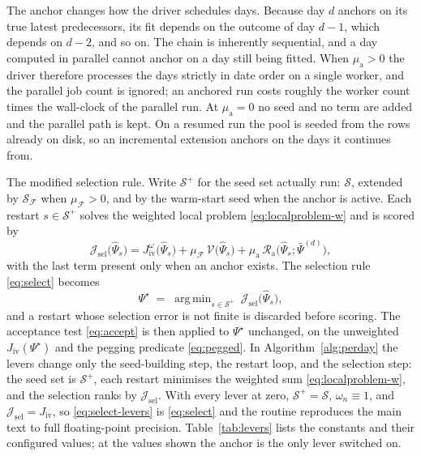 \documentclass[a4paper, 11pt, reqno]{amsart}
\makeatletter
\def\paragraph{\@startsection{paragraph}{4}%
	\z@\z@{-\fontdimen2\font}%
	{\normalfont\bfseries}}
\DeclareMathOperator*{\argmin}{arg\,min}
\newcommand{\ConstFellerPenaltySym}{\mu_{\mathcal{F}}}   \newcommand{\ConstFellerPenaltyVal}{0.0}
\newcommand{\ConstAnchorWeightSym}{\mu_{\mathrm{a}}}     \newcommand{\ConstAnchorWeightVal}{0.005}
\makeatother
\begin{document}
		The anchor changes how the driver schedules days. Because day $d$ anchors on its true latest
		predecessors, its fit depends on the outcome of day $d-1$, which depends on $d-2$, and so on. The
		chain is inherently sequential, and a day computed in parallel cannot anchor on a day still being
		fitted. When $\ConstAnchorWeightSym>0$ the driver therefore processes the days strictly in date
		order on a single worker, and the parallel job count is ignored; an anchored run costs roughly the
		worker count times the wall-clock of the parallel run. At $\ConstAnchorWeightSym=0$ no seed and no
		term are added and the parallel path is kept. On a resumed run the pool is seeded from the rows
		already on disk, so an incremental extension anchors on the days it continues from.

		\paragraph{The modified selection rule.} Write $\mathcal{S}^{+}$ for the seed set actually run:
		$\mathcal{S}$, extended by $\mathcal{S}_{\mathcal{F}}$ when $\ConstFellerPenaltySym>0$, and by
		the warm-start seed when the anchor is active. Each restart $s\in\mathcal{S}^{+}$ solves the
		weighted local problem \eqref{eq:localproblem-w} and is scored by
		\begin{equation}\label{eq:score}
			\mathcal{J}_{\mathrm{sel}}\bigl(\widehat\Psi_s\bigr)
			= J^{\omega}_{\mathrm{iv}}\bigl(\widehat\Psi_s\bigr)
			+ \ConstFellerPenaltySym\,\mathcal{V}\bigl(\widehat\Psi_s\bigr)
			+ \ConstAnchorWeightSym\,\mathcal{R}_{\mathrm{a}}\bigl(\widehat\Psi_s;\bar\Psi^{(d)}\bigr),
		\end{equation}
		with the last term present only when an anchor exists. The selection rule \eqref{eq:select}
		becomes
		\begin{equation}\label{eq:select-levers}
			\Psi^\star \;=\; \argmin_{s\in\mathcal{S}^{+}}\ \mathcal{J}_{\mathrm{sel}}\bigl(\widehat\Psi_s\bigr),
		\end{equation}
		and a restart whose selection error is not finite is discarded before scoring. The acceptance
		test \eqref{eq:accept} is then applied to $\Psi^\star$ unchanged, on the unweighted
		$J_{\mathrm{iv}}(\Psi^\star)$ and the pegging predicate \eqref{eq:pegged}. In
		Algorithm~\ref{alg:perday} the levers change only the seed-building step, the restart loop, and the
		selection step: the seed set is $\mathcal{S}^{+}$, each restart minimises the weighted sum
		\eqref{eq:localproblem-w}, and the selection ranks by $\mathcal{J}_{\mathrm{sel}}$. With every lever at zero, $\mathcal{S}^{+}=\mathcal{S}$,
		$\omega_n\equiv1$, and $\mathcal{J}_{\mathrm{sel}}=J_{\mathrm{iv}}$, so \eqref{eq:select-levers}
		is \eqref{eq:select} and the routine reproduces the main text to full floating-point precision.
		Table~\ref{tab:levers} lists the constants and their configured values; at the values shown the
		anchor is the only lever switched on.
\end{document}
